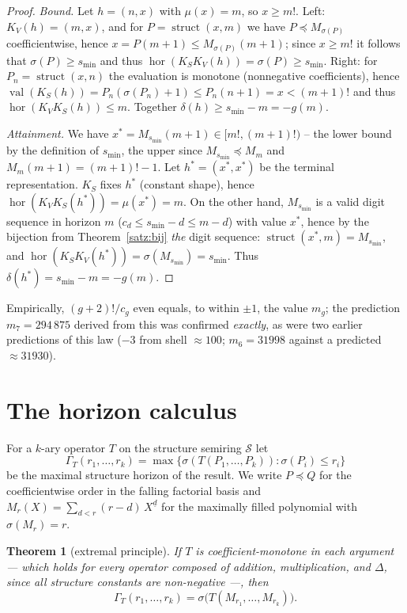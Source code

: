 \documentclass[11pt]{article}
\newtheorem{satz}{Theorem}[section]
\theoremstyle{definition}
\theoremstyle{remark}
\newcommand{\Struk}{\mathcal S}
\newcommand{\val}{\operatorname{val}}
\newcommand{\ff}[2]{#1^{\underline{#2}}}
\newcommand{\KV}{K_V}
\newcommand{\KS}{K_S}
\newcommand{\hor}{\operatorname{hor}}
\begin{document}
\begin{proof}
\emph{Bound.} Let $h=(n,x)$ with $\mu(x)=m$, so $x\ge m!$.
Left: $\KV(h)=(m,x)$, and for $P=\operatorname{struct}(x,m)$ we
have $P\preceq M_{\sigma(P)}$ coefficientwise, hence
$x=P(m{+}1)\le M_{\sigma(P)}(m{+}1)$; since $x\ge m!$ it follows
that $\sigma(P)\ge s_{\min}$ and thus
$\hor(\KS\KV(h))=\sigma(P)\ge s_{\min}$. Right: for
$P_n=\operatorname{struct}(x,n)$ the evaluation is monotone
(nonnegative coefficients), hence
$\val(\KS(h))=P_n(\sigma(P_n){+}1)\le P_n(n{+}1)=x<(m{+}1)!$ and
thus $\hor(\KV\KS(h))\le m$. Together
$\delta(h)\ge s_{\min}-m=-g(m)$.

\emph{Attainment.} We have
$x^*=M_{s_{\min}}(m{+}1)\in[m!,(m{+}1)!)$
-- the lower bound by the definition of $s_{\min}$, the upper
since $M_{s_{\min}}\preceq M_m$ and $M_m(m{+}1)=(m{+}1)!-1$. Let
$h^*=(x^*,x^*)$ be the terminal representation. $\KS$ fixes $h^*$
(constant shape), hence
$\hor(\KV\KS(h^*))=\mu(x^*)=m$. On the other hand, $M_{s_{\min}}$
is a valid digit sequence in horizon $m$
($c_d\le s_{\min}-d\le m-d$) with value $x^*$, hence by the
bijection from Theorem~\ref{satz:bij} \emph{the} digit
sequence: $\operatorname{struct}(x^*,m)=M_{s_{\min}}$, and
$\hor(\KS\KV(h^*))=\sigma(M_{s_{\min}})=s_{\min}$. Thus
$\delta(h^*)=s_{\min}-m=-g(m)$.
\end{proof}

Empirically, $(g{+}2)!/c_g$ even equals, to within $\pm1$, the
value $m_g$; the prediction $m_7=294\,875$ derived from this was
confirmed \emph{exactly}, as were two earlier predictions of this
law ($-3$ from shell ${\approx}100$; $m_6=31998$ against a
predicted ${\approx}31930$).

\section{The horizon calculus}

For a $k$-ary operator $T$ on the structure semiring
$\Struk$ let
\[
\Gamma_T(r_1,\ldots,r_k)=\max\{\sigma(T(P_1,\ldots,P_k)):
\sigma(P_i)\le r_i\}
\]
be the maximal structure horizon of the result.
We write $P\preceq Q$ for the coefficientwise order in the falling
factorial basis and
$M_r(X)=\sum_{d<r}(r{-}d)\,\ff Xd$ for the maximally filled
polynomial with $\sigma(M_r)=r$.

\begin{satz}[extremal principle]\label{satz:extremal}
If $T$ is coefficient-monotone in each argument --- which holds for
every operator composed of addition, multiplication, and $\Delta$,
since all structure constants are non-negative ---, then
\[
\Gamma_T(r_1,\ldots,r_k)=\sigma\bigl(T(M_{r_1},\ldots,M_{r_k})\bigr).
\]
\end{satz}
\end{document}

